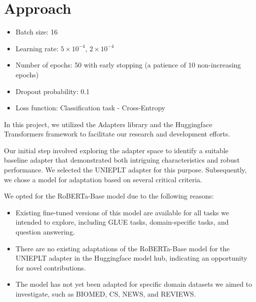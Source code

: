\documentclass[10pt,twocolumn,letterpaper]{article}
\begin{document}







\section{Approach}


\begin{itemize}
    \setlength\itemsep{-0.5em} %
    \item Batch size: 16
    \item Learning rate: \(5 \times 10^{-4}\), \(2 \times 10^{-4}\)
    \item Number of epochs: 50 with early stopping (a patience of 10 non-increasing epochs)
    \item Dropout probability: 0.1
    \item Loss function: Classification task - Cross-Entropy
\end{itemize}






In this project, we utilized the Adapters library and the Huggingface Transformers framework to facilitate our research and development efforts\cite{Poth2023Adapters,HuggingFaceQACourse}.

Our initial step involved exploring the adapter space to identify a suitable baseline adapter that demonstrated both intriguing characteristics and robust performance. We selected the UNIEPLT adapter for this purpose. Subsequently, we chose a model for adaptation based on several critical criteria.

We opted for the RoBERTa-Base model due to the following reasons:

\begin{itemize}
    \small %
    \setlength\itemsep{-0.5em} %
    \item Existing fine-tuned versions of this model are available for all tasks we intended to explore, including GLUE tasks, domain-specific tasks, and question answering.
    \item There are no existing adaptations of the RoBERTa-Base model for the UNIEPLT adapter in the Huggingface model hub, indicating an opportunity for novel contributions.
    \item The model has not yet been adapted for specific domain datasets we aimed to investigate, such as BIOMED, CS, NEWS, and REVIEWS.
\end{itemize}
\normalsize %
\end{document}
